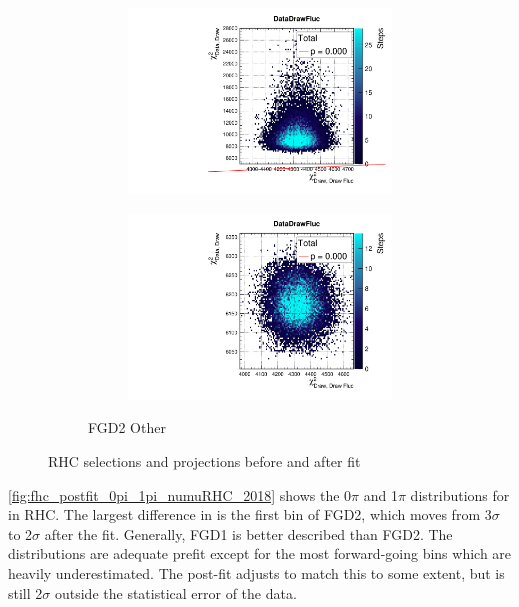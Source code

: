 \begin{figure}[h]
\begin{subfigure}[t]{\textwidth}
\begin{subfigure}[t]{0.24\textwidth}
			\includegraphics[width=\textwidth, trim={0mm 0mm 0mm 8mm}, clip,page=110]{figures/mach3/2018/data/2018a_FixedCov_RedCov_Mpi_Data_merge_PriorPred_procs}
		\end{subfigure}
		\begin{subfigure}[t]{0.24\textwidth}
			\includegraphics[width=\textwidth, trim={0mm 0mm 0mm 8mm}, clip,page=110]{figures/mach3/2018/data/2018a_FixedCov_RedCov_Mpi_Data_merge_PostPredStore_FullLLH_procs}
		\end{subfigure}
		\caption{FGD2 \numubar Other}
	\end{subfigure}
	\caption{RHC selections \pmu and \cosmu projections before and after fit}
	\label{fig:fhc_postfit_other_nubar_2018}
\end{figure}

\autoref{fig:fhc_postfit_0pi_1pi_numuRHC_2018} shows the 0$\pi$ and 1$\pi$ distributions for \numu in RHC. The largest difference in \pmu is the first bin of FGD2, which moves from 3$\sigma$ to 2$\sigma$ after the fit. Generally, FGD1 is better described than FGD2. The \cosmu distributions are adequate prefit except for the most forward-going bins which are heavily underestimated. The post-fit adjusts to match this to some extent, but is still 2$\sigma$ outside the statistical error of the data.

